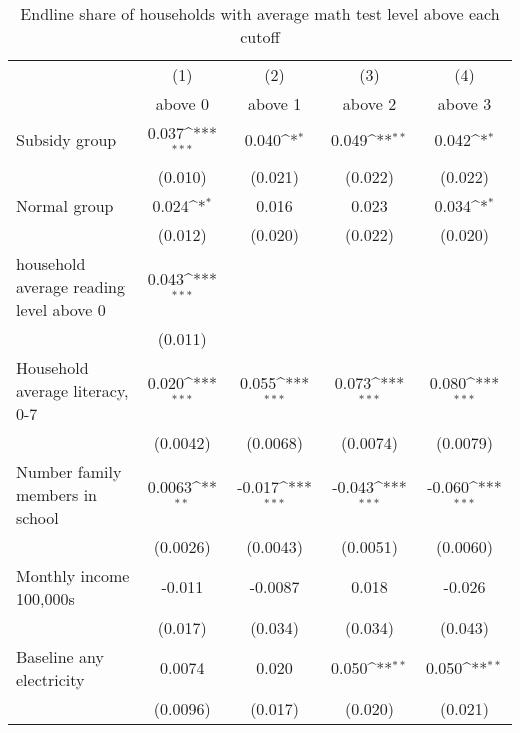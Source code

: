 \begin{table}[htbp]\centering
\def\sym#1{\ifmmode^{#1}\else\(^{#1}\)\fi}
\caption{Endline share of households with average math test level above each cutoff}
\begin{tabular*}{1\hsize}{@{\hskip\tabcolsep\extracolsep\fill}l*{4}{c}}
\toprule
                &\multicolumn{1}{c}{(1)}&\multicolumn{1}{c}{(2)}&\multicolumn{1}{c}{(3)}&\multicolumn{1}{c}{(4)}\\
                &\multicolumn{1}{c}{above 0}&\multicolumn{1}{c}{above 1}&\multicolumn{1}{c}{above 2}&\multicolumn{1}{c}{above 3}\\
\midrule
Subsidy group   &    0.037\sym{***}&    0.040\sym{*}  &    0.049\sym{**} &    0.042\sym{*}  \\
                &  (0.010)         &  (0.021)         &  (0.022)         &  (0.022)         \\
Normal group    &    0.024\sym{*}  &    0.016         &    0.023         &    0.034\sym{*}  \\
                &  (0.012)         &  (0.020)         &  (0.022)         &  (0.020)         \\
household average reading level above 0&    0.043\sym{***}&                  &                  &                  \\
                &  (0.011)         &                  &                  &                  \\
Household average literacy, 0-7&    0.020\sym{***}&    0.055\sym{***}&    0.073\sym{***}&    0.080\sym{***}\\
                & (0.0042)         & (0.0068)         & (0.0074)         & (0.0079)         \\
Number family members in school&   0.0063\sym{**} &   -0.017\sym{***}&   -0.043\sym{***}&   -0.060\sym{***}\\
                & (0.0026)         & (0.0043)         & (0.0051)         & (0.0060)         \\
Monthly income 100,000s&   -0.011         &  -0.0087         &    0.018         &   -0.026         \\
                &  (0.017)         &  (0.034)         &  (0.034)         &  (0.043)         \\
Baseline any electricity&   0.0074         &    0.020         &    0.050\sym{**} &    0.050\sym{**} \\
                & (0.0096)         &  (0.017)         &  (0.020)         &  (0.021)         \\

\end{tabular*}
\end{table}
